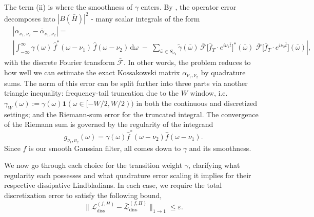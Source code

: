 The term (ii) is where the smoothness of $\gamma$ enters. By \cite[Lemma C.1]{chen2023quantum}, the operator error decomposes into $|B(\bar{H})|^2$ - many scalar integrals of the form
\begin{equation}
    \begin{split}
        &\left|\alpha_{\nu_1, \nu_2} - \bar{\alpha}_{\nu_1, \nu_2}\right| = \\
        &\left|\int_{-\infty}^{\infty} \gamma(\omega)\,\hat{f}^*(\omega - \nu_1)\,\hat{f}(\omega - \nu_2)\,\mathrm{d}\omega
\;-\;
\sum_{\bar{\omega} \in S_{\omega_0}} 
\tilde{\gamma}(\bar{\omega})\,
\bar{\mathcal{F}}\!\big[\bar{f}_T \cdot e^{i\nu_1\bar{t}}\big]^*\!(\bar{\omega})\;
\bar{\mathcal{F}}\!\big[\bar{f}_T \cdot e^{i\nu_2\bar{t}}\big](\bar{\omega})
        \right|,
    \end{split}
\end{equation}
with the discrete Fourier transform $\mathcal{\bar{F}}$.
In other words, the problem reduces to how well we can estimate the exact Kossakowski matrix $\alpha_{\nu_1, \nu_2}$ by quadrature sums. The norm of this error can be split further into three parts via another triangle inequality: frequency-tail truncation due to the $W$ window, i.e. $\gamma_W(\omega) := \gamma(\omega)\mathbf{1}(\omega \in [-W/2, W/2))$ in both the continuous and discretized settings; and the Riemann-sum error for the truncated integral. The convergence of the Riemann sum is governed by the regularity of the integrand 
\begin{equation}\label{eq:g-integrand}
    g_{\nu_1, \nu_2}(\omega) = \gamma(\omega)\hat{f}^*(\omega - \nu_2) \hat{f}(\omega - \nu_1).
\end{equation}
Since $\hat{f}$ is our smooth Gaussian filter, all comes down to $\gamma$ and its smoothness. 

We now go through each choice for the transition weight $\gamma$, clarifying what regularity each possesses and what quadrature error scaling it implies for their respective dissipative Lindbladians. In each case, we require the total discretization error to satisfy the following bound,
\begin{equation}
    \|\mathcal{L}^{(f,H)}_\text{diss} - \bar{\mathcal{L}}^{(f,H)}_\text{diss}\|_{1\to 1} \leq \varepsilon.
\end{equation}

